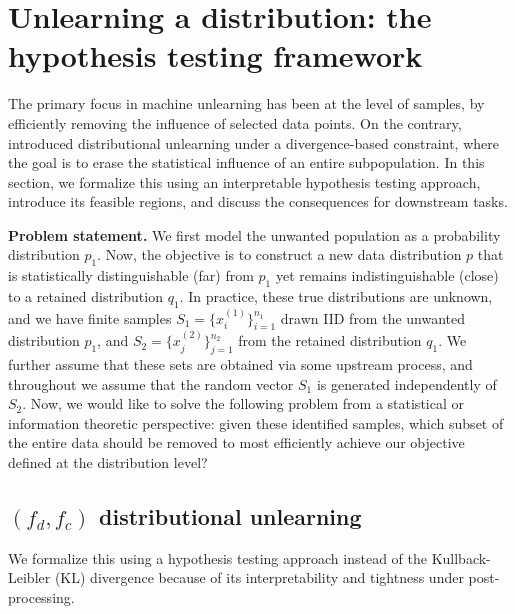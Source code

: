 \vspace{-4mm}
\section{Unlearning a distribution: the hypothesis testing framework}
\label{sec:problem}
\vspace{-2mm}
The primary focus in machine unlearning has been at the level of samples,  by efficiently removing the influence of selected data points. On the contrary, \cite{allouah2025distributionalmachineunlearningselective} introduced distributional unlearning under a divergence-based constraint, where the goal is to erase the statistical influence of an entire subpopulation. In this section, we formalize this using an interpretable hypothesis testing approach, introduce its feasible regions, and discuss the consequences for downstream tasks.

\vspace{-1 mm}
\textbf{Problem statement.}
We first model the unwanted population as a probability distribution $p_1$.  Now, the objective is to construct a new data distribution $p$ that is statistically distinguishable (far) from $p_1$ yet remains indistinguishable (close) to a retained distribution $q_1$. In practice, these true distributions are unknown, and we have finite samples $S_1 = \{x_i^{(1)}\}_{i=1}^{n_1}$ drawn IID from the unwanted distribution $p_1$, and $S_2 = \{x_j^{(2)}\}_{j=1}^{n_2}$ from the retained distribution $q_1$.
We further assume that these sets are obtained via some upstream process, and throughout we assume that the random vector $S_1$ is generated independently of $S_2$. Now, we would like to solve the following problem from a statistical or information theoretic perspective: given these identified samples, which subset of the entire data should be removed to most efficiently achieve our objective defined at the distribution level?
\vspace{-4mm}
\subsection{\texorpdfstring{$(f_d,f_c)$}{(f_d,f_c)} distributional unlearning}
\vspace{-2mm}
We formalize this using a hypothesis testing approach instead of the Kullback-Leibler (KL) divergence  \cite{allouah2025distributionalmachineunlearningselective} because of its interpretability and tightness under post-processing.

